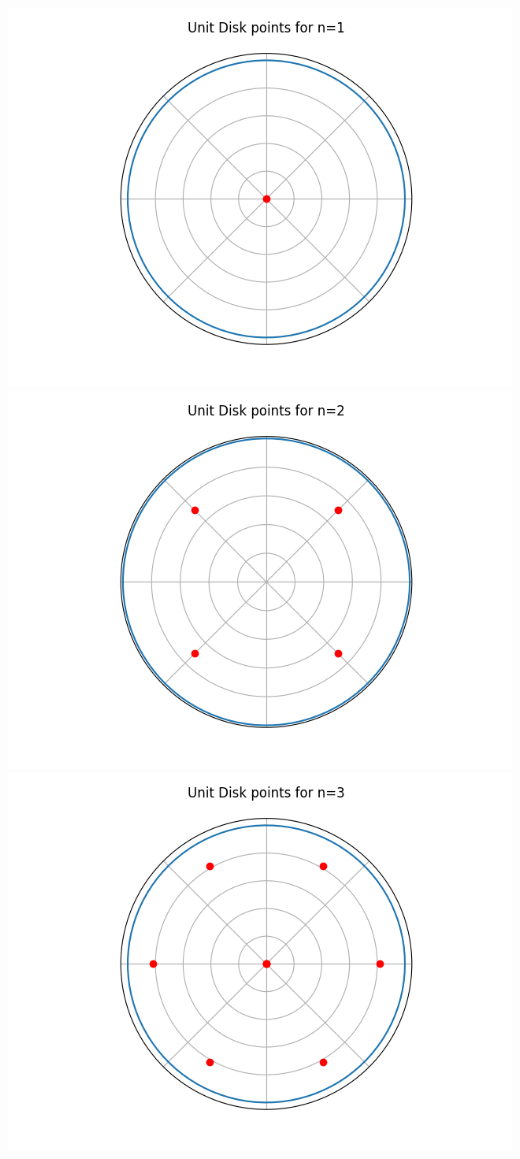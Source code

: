\documentclass[10pt,a4paper]{letter}
\begin{document}
\includegraphics[scale=.5]{disk0_n1}
\includegraphics[scale=.5]{disk0_n2}
\includegraphics[scale=.5]{disk0_n3}
\end{document}
